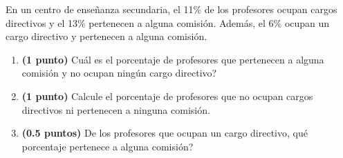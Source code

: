 
En un centro de enseñanza secundaria, el 11\% de los profesores ocupan
cargos directivos y el 13\% pertenecen a alguna comisión. Además, el 6\%
ocupan un cargo directivo y pertenecen a alguna comisión.
\begin{enumerate}[label=\alph*)]
  \item \textbf{(1 punto)} \textquestiondown{}Cuál es el porcentaje de
  profesores que pertenecen a alguna comisión y no ocupan ningún cargo directivo?
  \item \textbf{(1 punto)} Calcule el porcentaje de profesores que no ocupan
  cargos directivos ni pertenecen a ninguna comisión.
  \item \textbf{(0.5 puntos)} De los profesores que ocupan un cargo directivo,
  \textquestiondown{}qué porcentaje pertenece a alguna comisión?
\end{enumerate}
